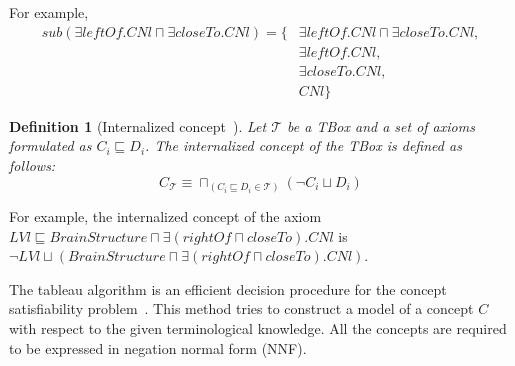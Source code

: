 \documentclass{article}
\newtheorem{mydef}{Definition}
\begin{document}
For example, 
 \begin{align*}
 sub(\exists leftOf.CNl \sqcap \exists closeTo.CNl)=\{&\exists leftOf.CNl \sqcap \exists closeTo.CNl,\\
 &\exists leftOf.CNl,\\
 &\exists closeTo.CNl,\\
 &CNl\}
 \end{align*}
 
\begin{mydef}[Internalized concept~\cite{baader2003description}]
Let $\mathcal{T}$ be a TBox and a set of axioms formulated as $C_i \sqsubseteq D_i$. The internalized concept of the TBox is defined as follows:
$$C_\mathcal{T} \equiv \sqcap_{(C_i \sqsubseteq D_i\in \mathcal{T})} (\neg C_i \sqcup D_i) $$
\label{def:ic}
\end{mydef}
For example, the internalized concept of the axiom $LVl \sqsubseteq BrainStructure \sqcap \exists (rightOf \sqcap closeTo). CNl$ is
$\neg LVl \sqcup (BrainStructure \sqcap \exists (rightOf \sqcap closeTo). CNl)$.

The tableau algorithm is an efficient decision procedure for the concept satisfiability problem~\cite{baader2001overview,gore2007exptime,nguyen2009efficient}.
This method tries to construct a model of a concept $C$ with respect to the given terminological knowledge. 
All the concepts are required to be expressed in negation normal form (NNF). 
\end{document}
